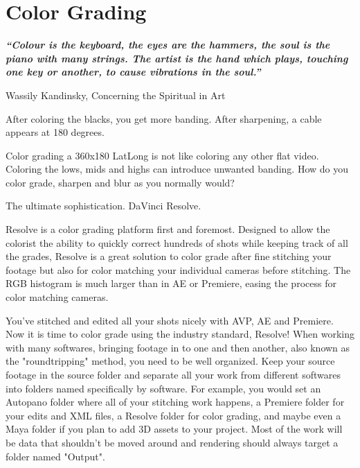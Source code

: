 \section{Color Grading}
\pagecolor{white}
\label{chap:54}
\begin{fullwidth}

{\itshape\bfseries “Colour is the keyboard, the eyes are the hammers, the soul is the piano with many strings. The artist is the hand which plays, touching one key or another, to cause vibrations in the soul.”}

Wassily Kandinsky, Concerning the Spiritual in Art
\vspace{\baselineskip}

\problem

{\large After coloring the blacks, you get more banding. After sharpening, a cable appears at 180 degrees. \par}

Color grading a 360x180 LatLong is not like coloring any other flat video. Coloring the lows, mids and highs can introduce unwanted banding. How do you color grade, sharpen and blur as you normally would? 

\solution

{\large The ultimate sophistication. DaVinci Resolve. \par}

Resolve is a color grading platform first and foremost. Designed to allow the colorist the ability to quickly correct hundreds of shots while keeping track of all the grades, Resolve is a great solution to color grade after fine stitching your footage but also for color matching your individual cameras before stitching. The RGB histogram is much larger than in AE or Premiere, easing the process for color matching cameras.


You've stitched and edited all your shots nicely with AVP, AE and Premiere. Now it is time to color grade using the industry standard, Resolve! When working with many softwares, bringing footage in to one and then another, also known as the "roundtripping" method, you need to be well organized. Keep your source footage in the source folder and separate all your work from different softwares into folders named specifically by software. For example, you would set an Autopano folder where all of your stitching work happens, a Premiere folder for your edits and XML files, a Resolve folder for color grading, and maybe even a Maya folder if you plan to add 3D assets to your project. Most of the work will be data that shouldn't be moved around and rendering should always target a folder named "Output". 


\end{fullwidth}
